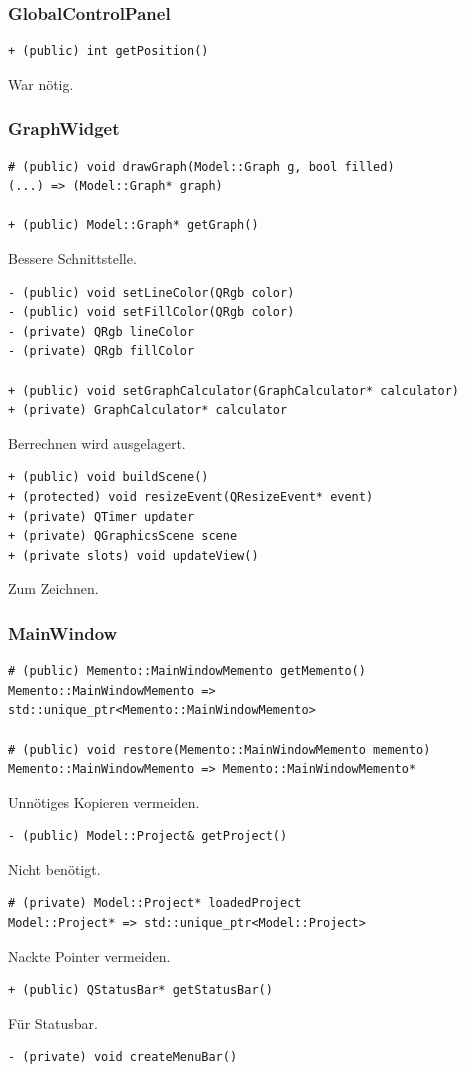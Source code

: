 \documentclass{scrartcl}
\begin{document}
{\subsubsection{GlobalControlPanel}
\begin{verbatim}
+ (public) int getPosition()
\end{verbatim}
War nötig.
\newpage
\subsubsection{GraphWidget}
\bigskip
\begin{verbatim}
# (public) void drawGraph(Model::Graph g, bool filled)
(...) => (Model::Graph* graph)

+ (public) Model::Graph* getGraph()
\end{verbatim}
Bessere Schnittstelle.
\bigskip
\begin{verbatim}
- (public) void setLineColor(QRgb color)
- (public) void setFillColor(QRgb color)
- (private) QRgb lineColor
- (private) QRgb fillColor

+ (public) void setGraphCalculator(GraphCalculator* calculator)
+ (private) GraphCalculator* calculator
\end{verbatim}
Berrechnen wird ausgelagert.
\bigskip
\begin{verbatim}
+ (public) void buildScene()
+ (protected) void resizeEvent(QResizeEvent* event)
+ (private) QTimer updater
+ (private) QGraphicsScene scene
+ (private slots) void updateView()
\end{verbatim}
Zum Zeichnen.
\newpage
\subsubsection{MainWindow}
\bigskip
\begin{verbatim}
# (public) Memento::MainWindowMemento getMemento()
Memento::MainWindowMemento => std::unique_ptr<Memento::MainWindowMemento>

# (public) void restore(Memento::MainWindowMemento memento)
Memento::MainWindowMemento => Memento::MainWindowMemento*
\end{verbatim}
Unnötiges Kopieren vermeiden.
\bigskip
\begin{verbatim}
- (public) Model::Project& getProject()
\end{verbatim}
Nicht benötigt.
\bigskip
\begin{verbatim}
# (private) Model::Project* loadedProject
Model::Project* => std::unique_ptr<Model::Project>
\end{verbatim}
Nackte Pointer vermeiden.
\bigskip
\begin{verbatim}
+ (public) QStatusBar* getStatusBar()
\end{verbatim}
Für Statusbar.
\bigskip
\begin{verbatim}
- (private) void createMenuBar()


\end{verbatim}}
\end{document}
